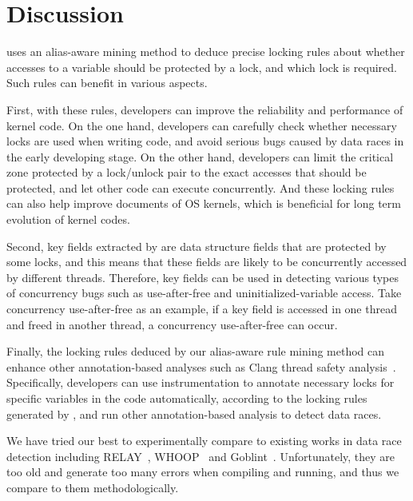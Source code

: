 \section{Discussion}
\label{sec_discussion}

 \sys uses an alias-aware mining method to 
deduce precise locking rules about whether accesses to a variable should be 
protected by a lock, and which lock is required. Such rules can benefit in 
various aspects. 

First, with these rules, developers can improve the reliability 
and performance of kernel code. On the one hand, developers can carefully check 
whether necessary locks are used when writing code, and avoid serious bugs 
caused by data races in the early developing stage. On the other hand, 
developers can limit the critical zone protected by a lock/unlock pair to the 
exact accesses that should be protected, and let other code can execute 
concurrently. And these locking rules can also help improve documents of OS 
kernels, which is beneficial  for long term evolution of kernel codes.

Second, key fields extracted by \sys are data structure fields that are 
protected by some locks, and this means that these fields are likely to be 
concurrently accessed by different threads. Therefore, key fields can be used 
in detecting various types of concurrency bugs such as use-after-free and 
uninitialized-variable access. Take concurrency use-after-free as an example, 
if a key field is accessed in one thread and freed in another thread, a 
concurrency use-after-free can occur.

Finally, the locking rules deduced by our alias-aware rule mining method can 
enhance other annotation-based analyses such as Clang thread safety 
analysis~\cite{ClangThreadSafety}. Specifically, developers can use 
instrumentation to annotate necessary locks for specific variables in the code 
automatically, according to the locking rules generated by \sys, and run other 
annotation-based analysis to detect data races.

 We have tried our best to experimentally 
compare \sys to existing works in data race detection including 
RELAY~\cite{Voung:FSE07}, WHOOP~\cite{Deligiannis:ASE15} and 
Goblint~\cite{Vojdani:ASE16}. Unfortunately, they are too old and generate too 
many errors when compiling and running, and thus we compare \sys to them 
methodologically.



